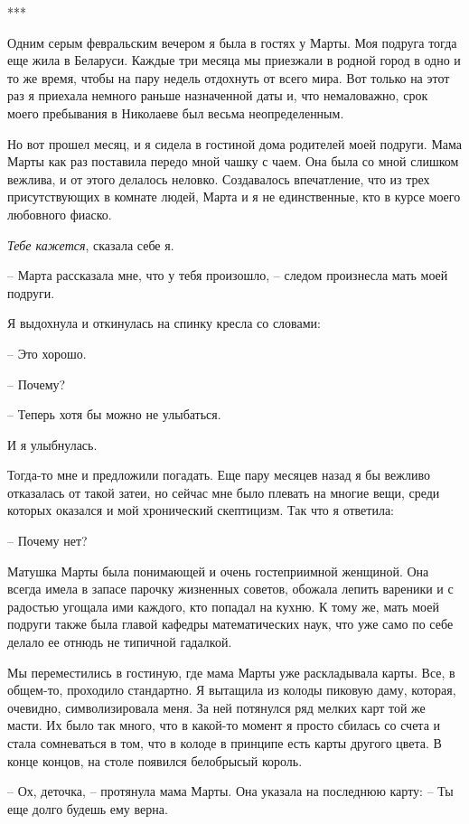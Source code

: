 \documentclass[
]{book}
\begin{document}
***

Одним серым февральским вечером я была в гостях у Марты. Моя подруга тогда еще жила в Беларуси. Каждые три месяца мы приезжали в родной город в одно и то же время, чтобы на пару недель отдохнуть от всего мира. Вот только на этот раз я приехала немного раньше назначенной даты и, что немаловажно, срок моего пребывания в Николаеве был весьма неопределенным.

Но вот прошел месяц, и я сидела в гостиной дома родителей моей подруги. Мама Марты как раз поставила передо мной чашку с чаем. Она была со мной слишком вежлива, и от этого делалось неловко. Создавалось впечатление, что из трех присутствующих в комнате людей, Марта и я не единственные, кто в курсе моего любовного фиаско.

\emph{Тебе кажется}, сказала себе я.

-- Марта рассказала мне, что у тебя произошло, -- следом произнесла мать моей подруги.

Я выдохнула и откинулась на спинку кресла со словами:

-- Это хорошо.

-- Почему?

-- Теперь хотя бы можно не улыбаться.

И я улыбнулась.

Тогда-то мне и предложили погадать. Еще пару месяцев назад я бы вежливо отказалась от такой затеи, но сейчас мне было плевать на многие вещи, среди которых оказался и мой хронический скептицизм. Так что я ответила:

-- Почему нет?

Матушка Марты была понимающей и очень гостеприимной женщиной. Она всегда имела в запасе парочку жизненных советов, обожала лепить вареники и с радостью угощала ими каждого, кто попадал на кухню. К тому же, мать моей подруги также была главой кафедры математических наук, что уже само по себе делало ее отнюдь не типичной гадалкой.

Мы переместились в гостиную, где мама Марты уже раскладывала карты. Все, в общем-то, проходило стандартно. Я вытащила из колоды пиковую даму, которая, очевидно, символизировала меня. За ней потянулся ряд мелких карт той же масти. Их было так много, что в какой-то момент я просто сбилась со счета и стала сомневаться в том, что в колоде в принципе есть карты другого цвета. В конце концов, на столе появился белобрысый король.

-- Ох, деточка, -- протянула мама Марты. Она указала на последнюю карту: -- Ты еще долго будешь ему верна.
\end{document}
